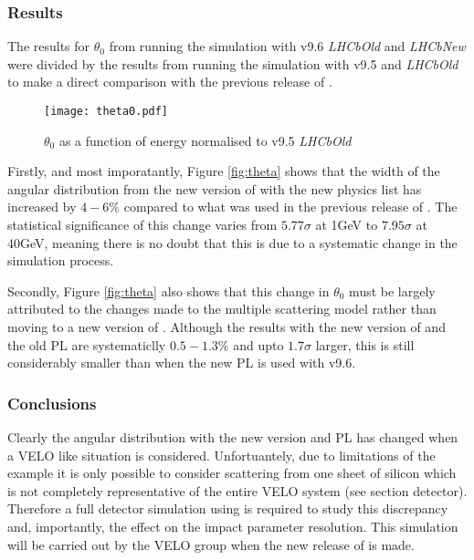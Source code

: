 \subsubsection{Results}
\label{sec:MscResults}
The results for $\theta_0$ from running the simulation with v9.6 \textit{LHCbOld} and \textit{LHCbNew} were divided by the results from running the simulation with v9.5 and \textit{LHCbOld} to make a direct comparison with the previous release of \geant.
\begin{figure}[h]
  \centering
  \texttt{[image: theta0.pdf]}
  \caption{$\theta_0$ as a function of energy normalised to \geant v9.5 \textit{LHCbOld}}
  \label{fig:theta0}
\end{figure}

Firstly, and most imporatantly, Figure \ref{fig:theta} shows that the width of the angular distribution from the new version of \geant with the new physics list has increased by $4-6\%$ compared to what was used in the previous release of \geant.  The statistical significance of this change varies from $5.77\sigma$ at 1GeV to $7.95\sigma$ at 40GeV, meaning there is no doubt that this is due to a systematic change in the simulation process.

Secondly, Figure \ref{fig:theta} also shows that this change in $\theta_0$ must be largely attributed to the changes made to the multiple scattering model rather than moving to a new version of \geant.  Although the results with the new version of \geant and the old PL are systematiclly $0.5-1.3\%$ and upto $1.7\sigma$ larger, this is still considerably smaller than when the new PL is used with v9.6.

\subsubsection{Conclusions}
\label{sec:Conclusions}
Clearly the angular distribution with the new \geant version and PL has changed when a \lhcb VELO like situation is considered.  Unfortuantely, due to limitations of the \geant example it is only possible to consider scattering from one sheet of silicon which is not completely representative of the entire VELO system (see section detector).  Therefore a full detector simulation using \gauss is required to study this discrepancy and, importantly, the effect on the impact parameter resolution.  This simulation will be carried out by the \lhcb VELO group when the new release of \gauss is made.

\clearpage
